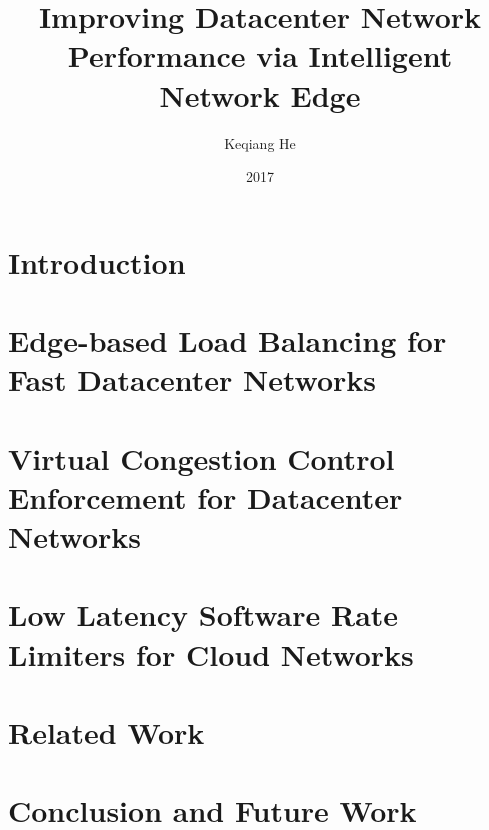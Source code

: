 \documentclass[12pt, letterpaper, oldfontcommands, numbers,oneside]{memoir}
\title{Improving Datacenter Network Performance via Intelligent Network Edge}
\author{Keqiang He}
\date{2017 \vspace{-1in}}
\begin{document}

\ifdef{\ShortenThesis}{
}{
  
}

\chapter{Introduction}
\label{thesis:chapter:intro}


\chapter{Edge-based Load Balancing for Fast Datacenter Networks}
\label{thesis:chapter:presto}


\chapter{Virtual Congestion Control Enforcement for Datacenter Networks}
\label{thesis:chapter:acdctcp}



\chapter{Low Latency Software Rate Limiters for Cloud Networks}
\label{thesis:chapter:rate_limiter}


\chapter{Related Work}
\label{thesis:chapter:related}


\chapter{Conclusion and Future Work}
\label{thesis:chapter:conclusion}






\end{document}
